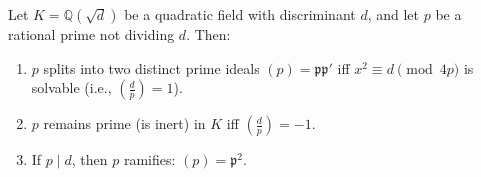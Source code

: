 Let $K = \mathbb{Q}(\sqrt{d})$ be a quadratic field with discriminant $d$, and let $p$ be a rational prime not dividing $d$. Then:
\begin{enumerate}
\item $p$ splits into two distinct prime ideals $(p) = \mathfrak{p}\mathfrak{p}'$ iff $x^2 \equiv d \pmod{4p}$ is solvable (i.e., $\left(\frac{d}{p}\right) = 1$).
\item $p$ remains prime (is inert) in $K$ iff $\left(\frac{d}{p}\right) = -1$.
\item If $p \mid d$, then $p$ ramifies: $(p) = \mathfrak{p}^2$.
\end{enumerate}
